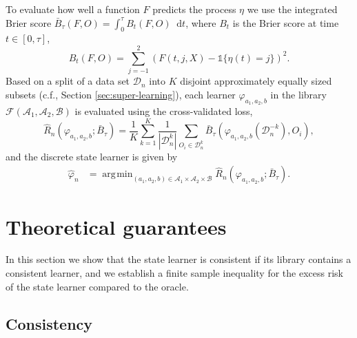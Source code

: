 \documentclass[a4paper,danish]{article}
\theoremstyle{plain} %
\numberwithin{theorem}{section}
\theoremstyle{definition} %
\theoremstyle{remark}
\renewcommand{\phi}{\varphi}
\newcommand*\diff{\mathop{}\!\mathrm{d}}
\newcommand{\1}{\mathds{1}}
\DeclareMathOperator*{\argmin}{\arg\!\min}
\newcommand{\data}{\ensuremath{\mathcal{D}}}
\begin{document}
To evaluate how well a function \( F \) predicts the
process $\eta$ we use the integrated Brier score \citep{graf1999assessment}
\( \bar B_\tau( F,O) = \int_0^{\tau} B_t(F,O) \diff t \),
where \( B_t \) is the Brier score
\citep{brier1950verification} at time \( t \in [0, \tau] \),
\begin{equation*}
  B_t(F,O) = \sum_{j=-1}^{2}
  \left(
      F(t,j,X) - \1{\{\eta(t)=j\}}
  \right)^2.
\end{equation*}
Based on a split of a data set \(\data_n\) into $K$ disjoint
approximately equally sized subsets (c.f., Section
\ref{sec:super-learning}), each learner
\( \phi_{a_1, a_2, b} \) in the library
\( \mathcal{F}(\mathcal{A}_1, \mathcal{A}_2, \mathcal{B}) \)
is evaluated using the cross-validated loss,
\begin{equation*}
  \hat{R}_{n}(\phi_{a_1,a_2,b} ; \bar{B}_{\tau}) =
  \frac{1}{K}\sum_{k=1}^{K}
  \frac{1}{| \data_n^{k} |}\sum_{O_i \in \data_n^{k}}
  \bar B_\tau
  {
    \left(
      \phi_{a_1,a_2,b}{ (\data_n^{-k})}
      , O_i
    \right)
  },
\end{equation*}
and the discrete state learner is given by
\begin{align*}\label{eq:discrete-state-learner}
  \hat{\phi}_n
  &=  \argmin_{(a_1,a_2,b)\in \mathcal{A}_1\times\mathcal{A}_2\times\mathcal{B}}
    \hat{R}_{n}(\phi_{a_1,a_2,b} ; \bar{B}_{\tau}).
\end{align*}




\section{Theoretical guarantees}
\label{sec:theor-results-prop}

In this section we show that the state learner is consistent if its
library contains a consistent learner, and we establish a finite
sample inequality for the excess risk of the state learner compared to
the oracle.

\subsection{Consistency}
\label{sec:consistency}
\end{document}
